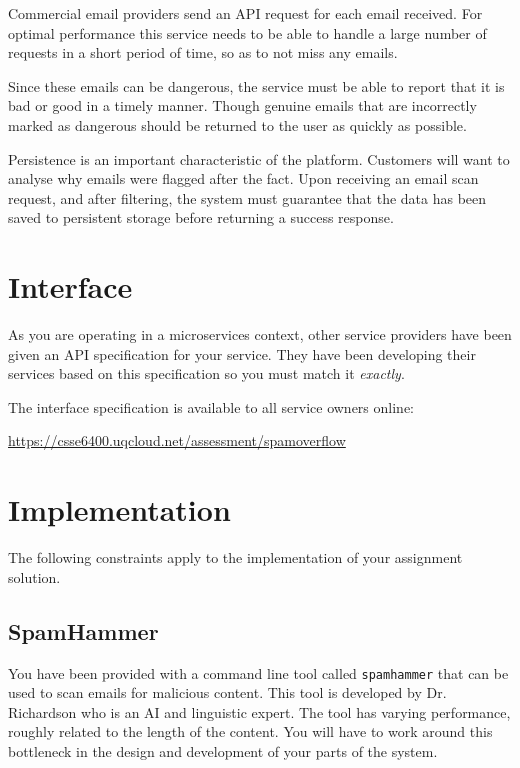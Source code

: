 \documentclass{csse4400}
\begin{document}
Commercial email providers send an API request for each email received.
For optimal performance this service needs to be able to handle a large number of requests in a short period of time, so as to not miss any emails.

Since these emails can be dangerous, the service must be able to report that it is bad or good in a timely manner.
Though genuine emails that are incorrectly marked as dangerous should be returned to the user as quickly as possible.

Persistence is an important characteristic of the platform.
Customers will want to analyse why emails were flagged after the fact.
Upon receiving an email scan request, and after filtering, the system must guarantee that the data has been saved to persistent storage before returning a success response.

\section{Interface}
As you are operating in a microservices context, other service providers have been given an API specification for your service.
They have been developing their services based on this specification so you must match it \emph{exactly}.

The interface specification is available to all service owners online: 

\url{https://csse6400.uqcloud.net/assessment/spamoverflow}

\section{Implementation}
The following constraints apply to the implementation of your assignment solution.

\subsection{SpamHammer}


You have been provided with a command line tool called \texttt{spamhammer} that can be used to scan emails for malicious content.
This tool is developed by Dr. Richardson who is an AI and linguistic expert.
The tool has varying performance, roughly related to the length of the content.
You will have to work around this bottleneck in the design and development of your parts of the system.
\end{document}
